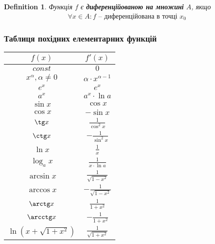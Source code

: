 \documentclass[a4paper, 14pt]{article}
\theoremstyle{theoremdd}
\theoremstyle{theoremdd}
\newtheorem{definition}[theorem]{Definition}
\theoremstyle{theoremdd}
\theoremstyle{theoremdd}
\theoremstyle{theoremdd}
\theoremstyle{theoremdd}
\theoremstyle{theoremdd}
\theoremstyle{theoremdd}
\begin{document}
\begin{definition}
Функція $f$ є \textbf{диференційованою на множині} $A$, якщо
\begin{align*}
\forall x \in A: f \text{ -- диференційована в точці } x_0
\end{align*}
\end{definition}

\subsubsection*{Таблиця похідних елементарних функцій}
\begin{center}
\begin{tabular}{ c|c }
 $f(x)$ & $f'(x)$ \\
 \hline 
 $const$ & $0$ \\ [2ex]
 \hline 
 $x^\alpha, \alpha \neq 0$ & $\alpha \cdot x^{\alpha-1}$ \\ [2ex]
 \hline 
 $e^x$ & $e^x$ \\ [2ex]
 \hline 
 $a^x$ & $a^x \cdot \ln a$ \\ [2ex]
 \hline 
 $\sin x$ & $\cos x$\\ [2ex]
 \hline 
 $\cos x$ & $-\sin x$\\ [2ex]
 \hline 
 $\tg x$ & $\displaystyle \frac{1}{\cos^2 x}$\\ [2ex]
 \hline 
 $\ctg x$ & $-\displaystyle \frac{1}{\sin^2 x}$\\ [2ex]
 \hline 
 $\ln x$ & $\displaystyle \frac{1}{x}$\\ [2ex]
 \hline 
 $\log_a x$ & $\displaystyle \frac{1}{x \cdot \ln a}$\\ [2ex]
 \hline 
 $\arcsin x$ & $\displaystyle \frac{1}{\sqrt{1-x^2}}$\\ [2ex]
 \hline 
 $\arccos x$ & $\displaystyle -\frac{1}{\sqrt{1-x^2}}$\\ [2ex]
 \hline 
 $\arctg x$ & $\displaystyle \frac{1}{1+x^2}$\\ [2ex]
 \hline 
 $\arcctg x$ & $\displaystyle -\frac{1}{1+x^2}$\\ [2ex]
 \hline 
 $\ln(x+\sqrt{1+x^2})$ & $\displaystyle \frac{1}{\sqrt{1+x^2}}$\\ [2ex]
 \hline 
\end{tabular}
\end{center}
\end{document}
